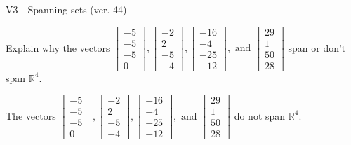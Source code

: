 \begin{exercise}
  \begin{exerciseTitle}V3 - Spanning sets (ver. 44)\end{exerciseTitle}
  \begin{exerciseStatement}
    Explain why the vectors \(\left[\begin{array}{r}
-5 \\
-5 \\
-5 \\
0
\end{array}\right] , \left[\begin{array}{r}
-2 \\
2 \\
-5 \\
-4
\end{array}\right] , \left[\begin{array}{r}
-16 \\
-4 \\
-25 \\
-12
\end{array}\right] , \text{ and } \left[\begin{array}{r}
29 \\
1 \\
50 \\
28
\end{array}\right]\) span or don't span \(\mathbb{R}^4\). 
	


  \end{exerciseStatement}
  \begin{exerciseAnswer}
   The vectors \(\left[\begin{array}{r}
-5 \\
-5 \\
-5 \\
0
\end{array}\right] , \left[\begin{array}{r}
-2 \\
2 \\
-5 \\
-4
\end{array}\right] , \left[\begin{array}{r}
-16 \\
-4 \\
-25 \\
-12
\end{array}\right] , \text{ and } \left[\begin{array}{r}
29 \\
1 \\
50 \\
28
\end{array}\right]\) 
  	 do not  
	span \(\mathbb{R}^4\).
  


  \end{exerciseAnswer}
\end{exercise}